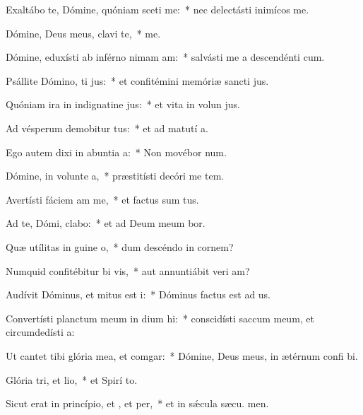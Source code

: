 \item Exaltábo te, Dómine, quóniam sceti me:~* nec delectásti inimícos   me.
\item Dómine, Deus meus, clavi  te,~*   me.
\item Dómine, eduxísti ab inférno nimam am:~* salvásti me a descendénti  cum.
\item Psállite Dómino, ti jus:~* et confitémini memóriæ sancti jus.
\item Quóniam ira in indignatine jus:~* et vita in volun jus.
\item Ad vésperum demobitur tus:~* et ad matutí a.
\item Ego autem dixi in abuntia a:~* Non movébor  num.
\item Dómine, in volunte a,~* præstitísti decóri me tem.
\item Avertísti fáciem am  me,~* et factus sum tus.
\item Ad te, Dómi, clabo:~* et ad Deum meum bor.
\item Quæ utílitas in guine o,~* dum descéndo in cornem?
\item Numquid confitébitur bi vis,~* aut annuntiábit veri am?
\item Audívit Dóminus, et mitus est i:~* Dóminus factus est ad us.
\item Convertísti planctum meum in dium hi:~* conscidísti saccum meum, et circumdedísti  a:
\item Ut cantet tibi glória mea, et  comgar:~* Dómine, Deus meus, in ætérnum confi bi.
\item Glória tri, et lio,~* et Spirí to.
\item Sicut erat in princípio, et , et per,~* et in sǽcula sæcu. men.
